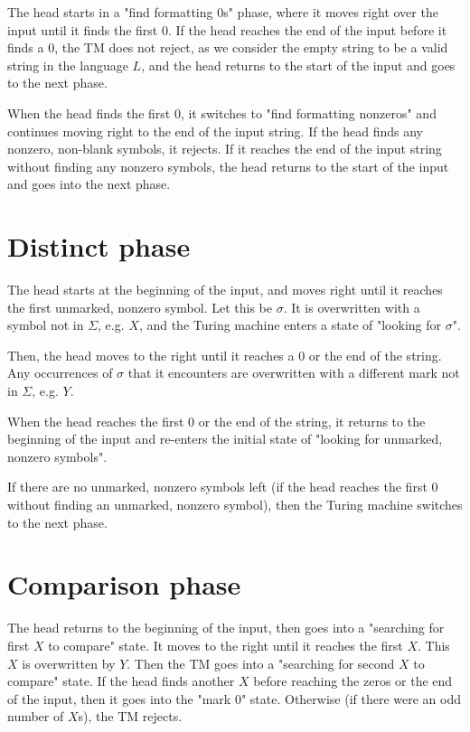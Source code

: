 \documentclass[11pt,addpoints,answers]{exam}
\newcommand{\1}{\mathbf{1}}
\begin{document}
\noindent The head starts in a "find formatting 0s" phase, where it moves right over the input until it finds the first 0. If the head reaches the end of the input before it finds a 0, the TM does not reject, as we consider the empty string to be a valid string in the language $L$, and the head returns to the start of the input and goes to the next phase.

\medskip

\noindent When the head finds the first 0, it switches to "find formatting nonzeros" and continues moving right to the end of the input string. If the head finds any nonzero, non-blank symbols, it rejects. If it reaches the end of the input string without finding any nonzero symbols, the head returns to the start of the input and goes into the next phase.

\section{Distinct phase}

The head starts at the beginning of the input, and moves right until it reaches the first unmarked, nonzero symbol. Let this be $\sigma$. It is overwritten with a symbol not in $\Sigma$, e.g. $X$, and the Turing machine enters a state of "looking for $\sigma$".

\medskip

\noindent Then, the head moves to the right until it reaches a $0$ or the end of the string. Any occurrences of $\sigma$ that it encounters are overwritten with a different mark not in $\Sigma$, e.g. $Y$.

\medskip

\noindent When the head reaches the first $0$ or the end of the string, it returns to the beginning of the input and re-enters the initial state of "looking for unmarked, nonzero symbols".

\medskip

\noindent If there are no unmarked, nonzero symbols left (if the head reaches the first $0$ without finding an unmarked, nonzero symbol), then the Turing machine switches to the next phase.

\section{Comparison phase}

The head returns to the beginning of the input, then goes into a "searching for first $X$ to compare" state. It moves to the right until it reaches the first $X$. This $X$ is overwritten by $Y$. Then the TM goes into a "searching for second $X$ to compare" state. If the head finds another $X$ before reaching the zeros or the end of the input, then it goes into the "mark 0" state. Otherwise (if there were an odd number of $X$s), the TM rejects.
\end{document}
